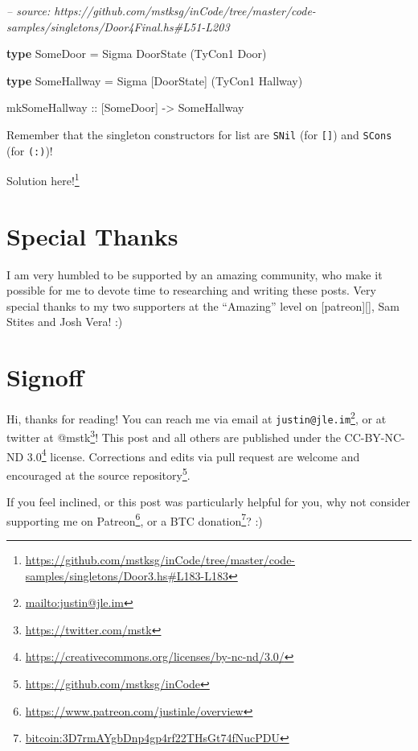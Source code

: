 \documentclass[]{article}
\newenvironment{Shaded}{}{}
\newcommand{\CommentTok}[1]{\textcolor[rgb]{0.38,0.63,0.69}{\textit{#1}}}
\newcommand{\DataTypeTok}[1]{\textcolor[rgb]{0.56,0.13,0.00}{#1}}
\newcommand{\FunctionTok}[1]{\textcolor[rgb]{0.02,0.16,0.49}{#1}}
\newcommand{\KeywordTok}[1]{\textcolor[rgb]{0.00,0.44,0.13}{\textbf{#1}}}
\newcommand{\NormalTok}[1]{#1}
\newcommand{\OtherTok}[1]{\textcolor[rgb]{0.00,0.44,0.13}{#1}}
\renewcommand{\href}[2]{#2\footnote{\url{#1}}}
\begin{document}
\begin{enumerate}
\begin{Shaded}
\begin{Highlighting}[]
\CommentTok{-- source: https://github.com/mstksg/inCode/tree/master/code-samples/singletons/Door4Final.hs#L51-L203}

\KeywordTok{type} \DataTypeTok{SomeDoor} \FunctionTok{=} \DataTypeTok{Sigma} \DataTypeTok{DoorState}\NormalTok{ (}\DataTypeTok{TyCon1} \DataTypeTok{Door}\NormalTok{)}

\KeywordTok{type} \DataTypeTok{SomeHallway} \FunctionTok{=} \DataTypeTok{Sigma}\NormalTok{ [}\DataTypeTok{DoorState}\NormalTok{] (}\DataTypeTok{TyCon1} \DataTypeTok{Hallway}\NormalTok{)}

\OtherTok{mkSomeHallway ::}\NormalTok{ [}\DataTypeTok{SomeDoor}\NormalTok{] }\OtherTok{->} \DataTypeTok{SomeHallway}
\end{Highlighting}
\end{Shaded}

  Remember that the singleton constructors for list are \texttt{SNil} (for
  \texttt{{[}{]}}) and \texttt{SCons} (for \texttt{(:)})!

  \href{https://github.com/mstksg/inCode/tree/master/code-samples/singletons/Door3.hs\#L183-L183}{Solution
  here!}
\end{enumerate}

\hypertarget{special-thanks}{%
\section{Special Thanks}\label{special-thanks}}

I am very humbled to be supported by an amazing community, who make it possible
for me to devote time to researching and writing these posts. Very special
thanks to my two supporters at the ``Amazing'' level on {[}patreon{]}{[}{]}, Sam
Stites and Josh Vera! :)

\hypertarget{signoff}{%
\section{Signoff}\label{signoff}}

Hi, thanks for reading! You can reach me via email at
\href{mailto:justin@jle.im}{\nolinkurl{justin@jle.im}}, or at twitter at
\href{https://twitter.com/mstk}{@mstk}! This post and all others are published
under the \href{https://creativecommons.org/licenses/by-nc-nd/3.0/}{CC-BY-NC-ND
3.0} license. Corrections and edits via pull request are welcome and encouraged
at \href{https://github.com/mstksg/inCode}{the source repository}.

If you feel inclined, or this post was particularly helpful for you, why not
consider \href{https://www.patreon.com/justinle/overview}{supporting me on
Patreon}, or a \href{bitcoin:3D7rmAYgbDnp4gp4rf22THsGt74fNucPDU}{BTC donation}?
:)
\end{document}
